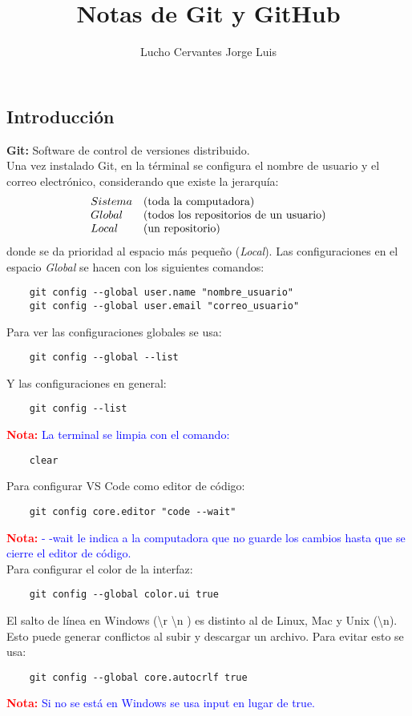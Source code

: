 \documentclass[10pt,oneside]{article}
\title{\textbf{Notas de Git y GitHub}}
\author{Lucho Cervantes Jorge Luis}
\begin{document}
\maketitle
\begin{multicols}{2}
    \section{Introducción}

    \textbf{Git:} Software de control de versiones distribuido. \\ \newline Una vez instalado Git, en la términal se configura el nombre de usuario y el correo electrónico, considerando que existe la jerarquía: 
    $$\begin{array}{ll}
        Sistema& (\textnormal{toda la computadora})  \\
        Global& (\textnormal{todos los repositorios de un usuario})   \\
        Local& (\textnormal{un repositorio})
    \end{array}$$
    donde se da prioridad al espacio más pequeño (\textit{Local}). Las configuraciones en el espacio \textit{Global} se hacen con los siguientes comandos:
    
\begin{verbatim}
    git config --global user.name "nombre_usuario"
    git config --global user.email "correo_usuario"
\end{verbatim}
Para ver las configuraciones globales se usa:
\begin{verbatim}
    git config --global --list
\end{verbatim}
Y las configuraciones en general:
\begin{verbatim}
    git config --list
\end{verbatim}
\textbf{\textcolor{red}{Nota:}} \textcolor{blue}{La terminal se limpia con el comando:}
\begin{verbatim}
    clear
\end{verbatim}
Para configurar VS Code como editor de código:
\begin{verbatim}
    git config core.editor "code --wait"
\end{verbatim}
\textbf{\textcolor{red}{Nota:}} \textcolor{blue}{- -wait le indica a la computadora que no guarde los cambios hasta que se cierre el editor de código.}\\ \newline
Para configurar el color de la interfaz:
\begin{verbatim}
    git config --global color.ui true
\end{verbatim}
El salto de línea en Windows (\textbackslash r \textbackslash n ) es distinto al de Linux, Mac y Unix (\textbackslash n). Esto puede generar conflictos al subir y descargar un archivo. Para evitar esto se usa:
\begin{verbatim}
    git config --global core.autocrlf true
\end{verbatim}
\textbf{\textcolor{red}{Nota:}} \textcolor{blue}{Si no se está en Windows se usa input en lugar de true. }

\end{multicols}
\end{document}
